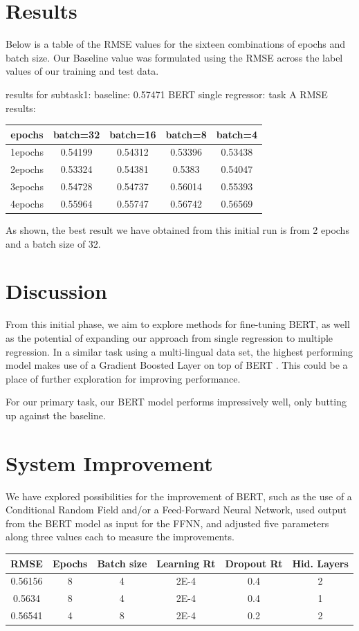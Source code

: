 \documentclass{article}
\begin{document}
\section{Results}

Below is a table of the RMSE values for the sixteen combinations of epochs and batch size. Our Baseline value was formulated using the RMSE across the label values of our training and test data.

results for subtask1:
baseline: 0.57471
BERT single regressor:
task A RMSE results:
\begin{center}
\begin{tabular}{|c|c|c|c|c|}
\hline
epochs & batch=32 & batch=16 & batch=8 & batch=4 \\
\hline
1epochs & 0.54199 & 0.54312 & 0.53396 & 0.53438 \\
2epochs & 0.53324 & 0.54381 & 0.5383 & 0.54047 \\
3epochs & 0.54728 & 0.54737 & 0.56014 & 0.55393 \\
4epochs & 0.55964 & 0.55747 & 0.56742 & 0.56569 \\
\hline
\end{tabular}
\end{center}

As shown, the best result we have obtained from this initial run is from 2 epochs and a batch size of 32.

\section{Discussion}

From this initial phase, we aim to explore methods for fine-tuning BERT, as well as the potential of expanding our approach from single regression to multiple regression. In a similar task using a multi-lingual data set, the highest performing model makes use of a Gradient Boosted Layer on top of BERT \cite{Ismailov2019HumorAB}. This could be a place of further exploration for improving performance.

For our primary task, our BERT model performs impressively well, only butting up against the baseline.

\section{System Improvement}
We have explored possibilities for the improvement of BERT, such as the use of a Conditional Random Field and/or a Feed-Forward Neural Network, used output from the BERT model as input for the FFNN, and adjusted five parameters along three values each to measure the improvements.
\begin{center}
\begin{tabular}{|c|c|c|c|c|c|}
\hline
RMSE & Epochs & Batch size & Learning Rt & Dropout Rt & Hid. Layers \\
\hline
0.56156 & 8 & 4 & 2E-4 & 0.4 & 2 \\
0.5634 & 8 & 4 & 2E-4 & 0.4 & 1 \\
0.56541 & 4 & 8 & 2E-4 & 0.2 & 2 \\
\hline
\end{tabular}
\end{center}
\end{document}
